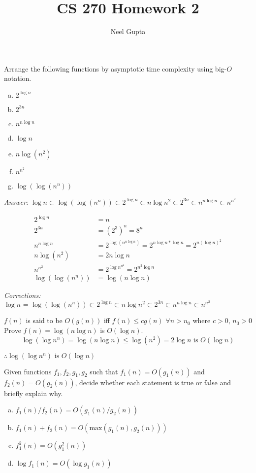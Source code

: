 \documentclass[12pt]{article}
\newenvironment{problem}[2][Problem]{\begin{trivlist}
\item[\hskip \labelsep {\bfseries #1}\hskip \labelsep {\bfseries #2.}]}{\end{trivlist}}
\begin{document}

\title{\vspace{-4.5cm}CS 270 Homework 2}
\author{Neel Gupta} 
\maketitle 
\begin{problem}{1}
Arrange the following functions by asymptotic time complexity using big-$O$ notation.
\begin{enumerate}[a)]
	\item $2^{\log n}$
	\item $2^{3n}$
	\item $n^{n\log n}$
	\item $\log n$
	\item $n\log(n^2)$
	\item $n^{n^2}$
	\item $\log(\log(n^n))$
\end{enumerate}
\end{problem}

\textit{Answer: } $\log n \subset \log(\log (n^n)) \subset 2^{\log n} \subset n \log n^2 \subset 2^{3n} \subset n^{n\log n} \subset n^{n^2}$

\begin{align*}
2^{\log n} &= n \\
2^{3n} &= (2^3)^n = 8^n\\
n^{n\log n} &= 2^{\log(n^{n\log n})} = 2^{{n\log n}*\log n} = 2^{n(\log n)^2}\\
n\log(n^2) &= 2n\log n\\
n^{n^2} &= 2^{\log n^{n^2}} = 2^{n^2\log n}\\
\log(\log(n^n)) &= \log(n\log n)
\end{align*}

\textit{Corrections:} \\ $\log n \textbf{ = } \log(\log (n^n)) \subset 2^{\log n} \subset n \log n^2 \subset 2^{3n} \subset n^{n\log n} \subset n^{n^2}$

$f(n)$ is said to be $O(g(n))$ iff $f(n)\leq c g(n)$ $\forall n>n_0 $ where $c>0$, $n_0>0$\\
Prove $f(n)=\log(n\log n)$ is $O(\log n)$.
$$
\log(\log n^n) = \log(n\log n) \leq \log(n^2) = 2\log n \text{ is } O(\log n)
$$

$\therefore \log(\log n^n) \text{ is } O(\log n)$

\begin{problem}{2}
Given functions $f_1, f_2, g_1, g_2$ such that $f_1(n)=O(g_1(n))$ and $f_2(n)=O(g_2(n))$, decide whether each statement is true or false and briefly explain why.
\begin{enumerate}[a)]
	\item $f_1(n)/f_2(n) = O(g_1(n)/g_2(n))$
	\item $f_1(n)+f_2(n) = O(\text{max}(g_1(n), g_2(n)))$
	\item $f_1^2(n) = O(g_1^2(n))$
	\item $\log f_1(n) = O(\log g_1(n))$
\end{enumerate}
\end{problem}
\end{document}

